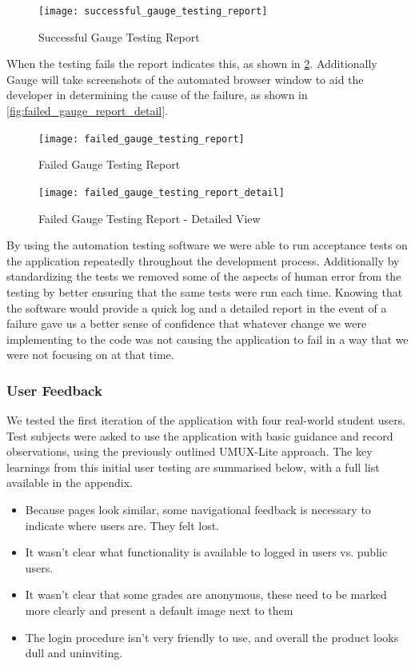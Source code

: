 \begin{figure}[H]
	\label{fig:success_gauge_report}
	\caption{Successful Gauge Testing Report}
	\texttt{[image: successful\_gauge\_testing\_report]}
\end{figure}

When the testing fails the report indicates this, as shown in \cref{fig:failed_gauge_report}. Additionally Gauge will take screenshots of the automated browser window to aid the developer in determining the cause of the failure, as shown in \cref{fig:failed_gauge_report_detail}.

\begin{figure}[H]
	\label{fig:failed_gauge_report}
	\caption{Failed Gauge Testing Report}
	\texttt{[image: failed\_gauge\_testing\_report]}
\end{figure}

\begin{figure}[H]
	\label{fig:failed_gauge_testing_report_detail}
	\caption{Failed Gauge Testing Report - Detailed View}
	\texttt{[image: failed\_gauge\_testing\_report\_detail]}
\end{figure}

By using the automation testing software we were able to run acceptance tests on the application repeatedly throughout the development process. Additionally by standardizing the tests we removed some of the aspects of human error from the testing by better ensuring that the same tests were run each time. Knowing that the software would provide a quick log and a detailed report in the event of a failure gave us a better sense of confidence that whatever change we were implementing to the code was not causing the application to fail in a way that we were not focusing on at that time.


\subsubsection{User Feedback}

We tested the first iteration of the application with four real-world student users. Test subjects were asked to use the application with basic guidance and record observations, using the previously outlined UMUX-Lite approach. The key learnings from this initial user testing are summarised below, with a full list available in the appendix.

\begin{itemize}
    \item Because pages look similar, some navigational feedback is necessary to indicate where users are. They felt lost.
    \item It wasn't clear what functionality is available to logged in users vs. public users.
    \item It wasn't clear that some grades are anonymous, these need to be marked more clearly and present a default image next to them
    \item The login procedure isn't very friendly to use, and overall the product looks dull and uninviting.
\end{itemize}

